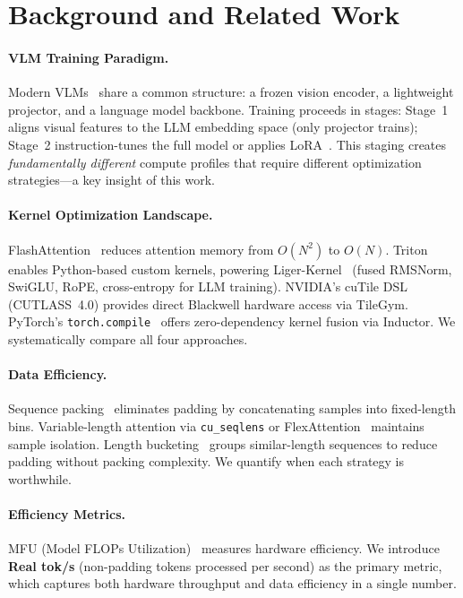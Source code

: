 \documentclass[11pt,a4paper]{article}
\begin{document}
\section{Background and Related Work}
\label{sec:related}

\paragraph{VLM Training Paradigm.}
Modern VLMs~\cite{liu2023llava,chen2024internvl,bai2023qwenvl,wang2024qwen2vl} share a
common structure: a frozen vision encoder, a lightweight projector, and a language model
backbone. Training proceeds in stages: Stage~1 aligns visual features to the LLM embedding
space (only projector trains); Stage~2 instruction-tunes the full model or applies
LoRA~\cite{hu2022lora}. This staging creates \emph{fundamentally different} compute
profiles that require different optimization strategies---a key insight of this work.

\paragraph{Kernel Optimization Landscape.}
FlashAttention~\cite{dao2022flashattention,dao2023flashattention2} reduces attention memory
from $O(N^2)$ to $O(N)$. Triton~\cite{tillet2019triton} enables Python-based custom kernels,
powering Liger-Kernel~\cite{hsu2024liger} (fused RMSNorm, SwiGLU, RoPE, cross-entropy for
LLM training). NVIDIA's cuTile DSL (CUTLASS~4.0) provides direct Blackwell hardware access
via TileGym. PyTorch's \texttt{torch.compile}~\cite{ansel2024pytorch} offers zero-dependency
kernel fusion via Inductor. We systematically compare all four approaches.

\paragraph{Data Efficiency.}
Sequence packing~\cite{krell2021efficient} eliminates padding by concatenating samples into
fixed-length bins. Variable-length attention via \texttt{cu\_seqlens} or
FlexAttention~\cite{he2024flexattention} maintains sample isolation. Length
bucketing~\cite{raffel2020t5} groups similar-length sequences to reduce padding without
packing complexity. We quantify when each strategy is worthwhile.

\paragraph{Efficiency Metrics.}
MFU (Model FLOPs Utilization)~\cite{chowdhery2023palm} measures hardware efficiency.
We introduce \textbf{Real tok/s} (non-padding tokens processed per second) as the primary
metric, which captures both hardware throughput and data efficiency in a single number.
\end{document}
